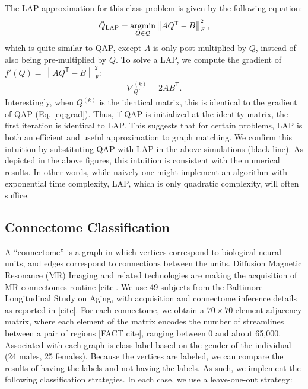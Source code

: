 \documentclass{article} %
\providecommand{\norm}[1]{\left \lVert#1 \right  \rVert}
\newcommand{\argmin}{\operatornamewithlimits{argmin}}
\newcommand{\T}{^{\ensuremath{\mathsf{T}}}}           %
\providecommand{\mc}[1]{\mathcal{#1}}
\providecommand{\mh}[1]{\hat{#1}}
\begin{document}
The LAP approximation for this class problem is given by the following equation:
\begin{align} \label{eq:LAP}
	\mh{Q}_{\text{LAP}} = \argmin_{Q \in \mc{Q}} \norm{A Q\T - B }^2_F,
\end{align}
which is quite similar to QAP, except $A$ is only post-multiplied by $Q$, instead of also being pre-multiplied by $Q$. To solve a LAP, we compute the gradient of $f'(Q)=\norm{AQ\T-B}_F^2$:
\begin{align} \label{eq:grad2}
	\nabla_{Q'}^{(k)} = 2A B\T. 
\end{align}
Interestingly, when $Q^{(k)}$ is the identical matrix, this is identical to the gradient of QAP  (Eq. \eqref{eq:grad}).  Thus, if QAP is initialized at the identity matrix, the first iteration is identical to LAP.  This suggests that for certain problems, LAP is both an efficient and useful approximation to graph matching.  We confirm this intuition by substituting QAP with LAP in the above simulations (black line).  As depicted in the above figures, this intuition is consistent with the numerical results. In other words, while naively one might implement an algorithm with exponential time complexity, LAP, which is only quadratic complexity, will often suffice.



\subsection{Connectome Classification} %
\label{sub:connectome_classification}

A ``connectome'' is a graph in which vertices correspond to biological neural units, and edges correspond to connections between the units.  Diffusion Magnetic Resonance (MR) Imaging and related technologies are making the acquisition of MR connectomes routine [cite].  We use 49 subjects from the Baltimore Longitudinal Study on Aging, with acquisition and connectome inference details as reported in [cite].  For each connectome, we obtain a $70 \times 70$ element adjacency matrix, where each element of the matrix encodes the number of streamlines between a pair of regions [FACT cite], ranging between 0 and about 65,000.  Associated with each graph is class label based on the gender of the individual (24 males, 25 females).  Because the vertices are labeled, we can compare the results of having the labels and not having the labels.  As such, we implement the following classification strategies.  In each case, we use a leave-one-out strategy:
\end{document}
